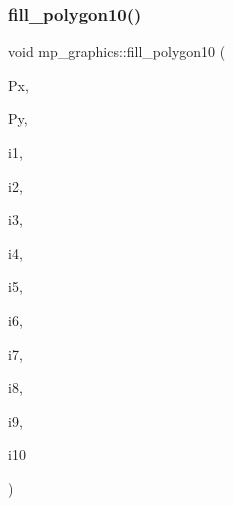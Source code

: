 \mbox{\label{classmp__graphics_ad4bdfab77b071e9ec87c321973f39d85}} 
\subsubsection{\texorpdfstring{fill\+\_\+polygon10()}{fill\_polygon10()}}
{\footnotesize\ttfamily void mp\+\_\+graphics\+::fill\+\_\+polygon10 (\begin{DoxyParamCaption}\item[{\mbox{\hyperlink{galois_8h_a09fddde158a3a20bd2dcadb609de11dc}{I\+NT}} $\ast$}]{Px,  }\item[{\mbox{\hyperlink{galois_8h_a09fddde158a3a20bd2dcadb609de11dc}{I\+NT}} $\ast$}]{Py,  }\item[{\mbox{\hyperlink{galois_8h_a09fddde158a3a20bd2dcadb609de11dc}{I\+NT}}}]{i1,  }\item[{\mbox{\hyperlink{galois_8h_a09fddde158a3a20bd2dcadb609de11dc}{I\+NT}}}]{i2,  }\item[{\mbox{\hyperlink{galois_8h_a09fddde158a3a20bd2dcadb609de11dc}{I\+NT}}}]{i3,  }\item[{\mbox{\hyperlink{galois_8h_a09fddde158a3a20bd2dcadb609de11dc}{I\+NT}}}]{i4,  }\item[{\mbox{\hyperlink{galois_8h_a09fddde158a3a20bd2dcadb609de11dc}{I\+NT}}}]{i5,  }\item[{\mbox{\hyperlink{galois_8h_a09fddde158a3a20bd2dcadb609de11dc}{I\+NT}}}]{i6,  }\item[{\mbox{\hyperlink{galois_8h_a09fddde158a3a20bd2dcadb609de11dc}{I\+NT}}}]{i7,  }\item[{\mbox{\hyperlink{galois_8h_a09fddde158a3a20bd2dcadb609de11dc}{I\+NT}}}]{i8,  }\item[{\mbox{\hyperlink{galois_8h_a09fddde158a3a20bd2dcadb609de11dc}{I\+NT}}}]{i9,  }\item[{\mbox{\hyperlink{galois_8h_a09fddde158a3a20bd2dcadb609de11dc}{I\+NT}}}]{i10 }\end{DoxyParamCaption})}

\mbox{\label{classmp__graphics_a2e0619ba53b4fc3dc9b4ae4aeffb7db7}} 
